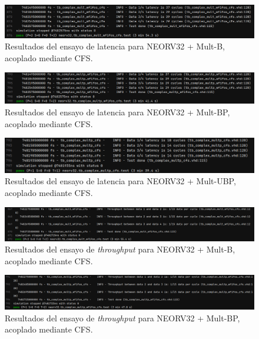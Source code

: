 \begin{figure}[H]
    \centering
    \includegraphics[width=14cm]{Figuras/result/lat12.png}
    \caption{Resultados del ensayo de latencia para NEORV32 + Mult-B, acoplado mediante CFS.}
    \label{fig:lat12}
\end{figure}

\begin{figure}[H]
    \centering
    \includegraphics[width=14cm]{Figuras/result/lat13.png}
    \caption{Resultados del ensayo de latencia para NEORV32 + Mult-BP, acoplado mediante CFS.}
    \label{fig:lat13}
\end{figure}

\begin{figure}[H]
    \centering
    \includegraphics[width=14cm]{Figuras/result/lat14.png}
    \caption{Resultados del ensayo de latencia para NEORV32 + Mult-UBP, acoplado mediante CFS.}
    \label{fig:lat14}
\end{figure}

\begin{figure}[H]
    \centering
    \includegraphics[width=14cm]{Figuras/result/thr8.png}
    \caption{Resultados del ensayo de \textit{throughput} para NEORV32 + Mult-B, acoplado mediante CFS.}
    \label{fig:thr8}
\end{figure}

\begin{figure}[H]
    \centering
    \includegraphics[width=14cm]{Figuras/result/thr9.png}
    \caption{Resultados del ensayo de \textit{throughput} para NEORV32 + Mult-BP, acoplado mediante CFS.}
    \label{fig:thr9}
\end{figure}

